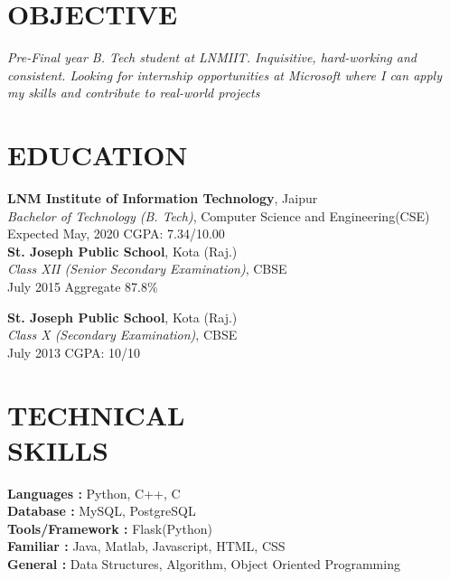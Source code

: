 \documentclass[margin]{res}
\begin{document}
\begin{resume}

\section{OBJECTIVE}
{\sl Pre-Final year B. Tech student at LNMIIT. Inquisitive, hard-working and consistent. Looking for internship opportunities at Microsoft where I can apply my skills and contribute to real-world projects }

\section{EDUCATION}
\textbf{LNM Institute of Information Technology}, Jaipur\\
{\sl Bachelor of Technology (B. Tech)}, Computer Science and Engineering(CSE)\\
Expected May, 2020
\hfill CGPA: 7.34/10.00\\

\textbf{St. Joseph Public School}, Kota (Raj.) \\
{\sl Class XII (Senior Secondary Examination)}, CBSE\\
July 2015
\hfill Aggregate 87.8\%

\textbf{St. Joseph Public School}, Kota (Raj.) \\
{\sl Class X (Secondary Examination)}, CBSE\\
July 2013
\hfill CGPA: 10/10



\section{TECHNICAL\\SKILLS}

\textbf{Languages : } Python, C++, C
\\
\textbf{Database :} MySQL, PostgreSQL
\\
\textbf{Tools/Framework : } Flask(Python)
\\
\textbf{Familiar : } Java, Matlab, Javascript, HTML, CSS
\\
\textbf{General : } Data Structures, Algorithm, Object Oriented Programming


\end{resume}
\end{document}
